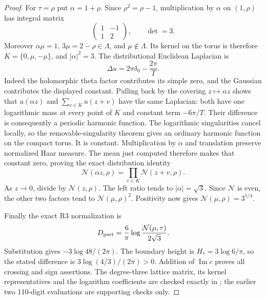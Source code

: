 \begin{proof}
For \(\tau=\rho\) put \(\alpha=1+\rho\). Since
\(\rho^2=\rho-1\), multiplication by \(\alpha\) on
\((1,\rho)\) has integral matrix
\[
 \begin{pmatrix}1&-1\\1&2\end{pmatrix},\qquad \det=3.
\]
Moreover \(\alpha\mu=1\), \(3\mu=2-\rho\in\Lambda\),
and \(\mu\notin\Lambda\). Its kernel on the torus is therefore
\(K=\{0,\mu,-\mu\}\), and \(|\alpha|^2=3\).
The distributional Euclidean Laplacian is
\[
 \Delta u=2\pi\delta_0-\frac{2\pi}{T}.
\]
Indeed the holomorphic theta factor contributes its simple zero,
and the Gaussian contributes the displayed constant. Pulling back
by the covering \(z\mapsto\alpha z\) shows that
\(u(\alpha z)\) and \(\sum_{v\in K}u(z+v)\) have the same
Laplacian: both have one logarithmic mass at every point of \(K\)
and constant term \(-6\pi/T\). Their difference is consequently
a periodic harmonic function. The logarithmic singularities cancel
locally, so the removable-singularity theorem gives an ordinary
harmonic function on the compact torus. It is constant.
Multiplication by \(\alpha\) and translation preserve normalized
Haar measure. The mean just computed therefore makes that constant
zero, proving the exact distribution identity
\[
 \mathcal N(\alpha z,\rho)
       =\prod_{v\in K}\mathcal N(z+v,\rho).
\]
As \(z\to0\), divide by \(\mathcal N(z,\rho)\). The left
ratio tends to \(|\alpha|=\sqrt3\). Since \(\mathcal N\) is
even, the other two factors tend to \(\mathcal N(\mu,\rho)^2\).
Positivity now gives \(\mathcal N(\mu,\rho)=3^{1/4}\).

Finally the exact R3 normalization is
\[
 D_{\rm part}=\frac6\pi
          \log\frac{\mathcal N(\mu,\tau)}{2\sqrt3}.
\]
Substitution gives \(-3\log48/(2\pi)\). The boundary height is
\(H_*=3\log6/\pi\), so the stated difference is
\(3\log(4/3)/(2\pi)>0\). Addition of \(\operatorname{Im}c\)
proves all crossing and sign assertions. The degree-three lattice
matrix, its kernel representatives and the logarithm coefficients
are checked exactly in ; the
earlier two 110-digit evaluations are supporting checks only.
\end{proof}

